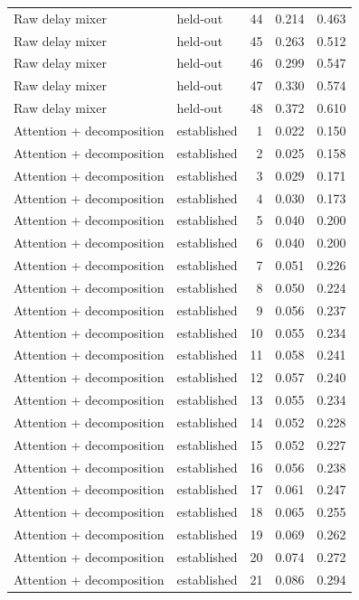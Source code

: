 \begin{tabular}{llrrr}
Raw delay mixer & held-out & 44 & 0.214 & 0.463 \\
Raw delay mixer & held-out & 45 & 0.263 & 0.512 \\
Raw delay mixer & held-out & 46 & 0.299 & 0.547 \\
Raw delay mixer & held-out & 47 & 0.330 & 0.574 \\
Raw delay mixer & held-out & 48 & 0.372 & 0.610 \\
Attention + decomposition & established & 1 & 0.022 & 0.150 \\
Attention + decomposition & established & 2 & 0.025 & 0.158 \\
Attention + decomposition & established & 3 & 0.029 & 0.171 \\
Attention + decomposition & established & 4 & 0.030 & 0.173 \\
Attention + decomposition & established & 5 & 0.040 & 0.200 \\
Attention + decomposition & established & 6 & 0.040 & 0.200 \\
Attention + decomposition & established & 7 & 0.051 & 0.226 \\
Attention + decomposition & established & 8 & 0.050 & 0.224 \\
Attention + decomposition & established & 9 & 0.056 & 0.237 \\
Attention + decomposition & established & 10 & 0.055 & 0.234 \\
Attention + decomposition & established & 11 & 0.058 & 0.241 \\
Attention + decomposition & established & 12 & 0.057 & 0.240 \\
Attention + decomposition & established & 13 & 0.055 & 0.234 \\
Attention + decomposition & established & 14 & 0.052 & 0.228 \\
Attention + decomposition & established & 15 & 0.052 & 0.227 \\
Attention + decomposition & established & 16 & 0.056 & 0.238 \\
Attention + decomposition & established & 17 & 0.061 & 0.247 \\
Attention + decomposition & established & 18 & 0.065 & 0.255 \\
Attention + decomposition & established & 19 & 0.069 & 0.262 \\
Attention + decomposition & established & 20 & 0.074 & 0.272 \\
Attention + decomposition & established & 21 & 0.086 & 0.294 \\

\end{tabular}
